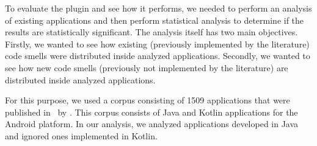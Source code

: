 
To evaluate the plugin and see how it performs, we needed to perform an analysis of existing applications and then
perform statistical analysis to determine if the results are statistically significant.
The analysis itself has two main objectives.
Firstly, we wanted to see how existing (previously implemented by the literature) code smells were distributed
inside analyzed applications.
Secondly, we wanted to see how new code smells (previously not implemented by the literature) are distributed
inside analyzed applications.


For this purpose, we used a corpus consisting of 1509 applications that were published in~\cite{kotlin_android_corpus} by
\citeauthor{kotlin_android_corpus}.
This corpus consists of Java and Kotlin applications for the Android platform.
In our analysis, we analyzed applications developed in Java and ignored ones implemented in Kotlin.

